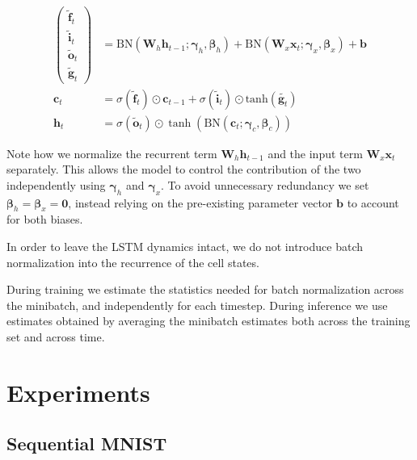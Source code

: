 \documentclass{article} %
\newcommand{\vect}[1]{\mathbf{#1}}
\newcommand{\mat}[1]{\mathbf{#1}}
\newcommand{\ewprod}{\odot}
\begin{document}
\begin{align}
\left(\begin{array}{ccc}
\tilde{\vect{f}}_t \\
\tilde{\vect{i}}_t \\
\tilde{\vect{o}}_t \\
\tilde{\vect{g}}_t
\end{array}\right)
 &=
 \mathrm{BN} (\mat{W}_h \vect{h}_{t-1}; \vect{\gamma}_h, \vect{\beta}_h) +
 \mathrm{BN} (\mat{W}_x \vect{x}_t    ; \vect{\gamma}_x, \vect{\beta}_x) +
 \vect{b}
\\
\vect{c}_t &= \sigma(\tilde{\vect{f}}_t) \ewprod \vect{c}_{t-1} +
              \sigma(\tilde{\vect{i}}_t) \ewprod \mathrm{tanh}(\tilde{\vect{g}_t}) \\
\vect{h}_t &= \sigma(\tilde{\vect{o}}_t) \ewprod \tanh(
 \mathrm{BN} (\vect{c}_t; \vect{\gamma}_c, \vect{\beta}_c)
)
\end{align}

Note how we normalize the recurrent term $\mat{W}_h \vect{h}_{t-1}$ and the input term $\mat{W}_x \vect{x}_t$ separately.
This allows the model to control the contribution of the two independently using $\vect{\gamma}_h$ and $\vect{\gamma}_x$.
To avoid unnecessary redundancy we set $\vect{\beta}_h = \vect{\beta}_x = \vect{0}$, instead relying on the pre-existing parameter vector $\vect{b}$ to account for both biases.

In order to leave the LSTM dynamics intact, we do not introduce batch normalization into the recurrence of the cell states.

During training we estimate the statistics needed for batch normalization across the minibatch, and independently for each timestep.
During inference we use estimates obtained by averaging the minibatch estimates both across the training set and across time.

\section{Experiments}

\subsection{Sequential MNIST}
\end{document}
